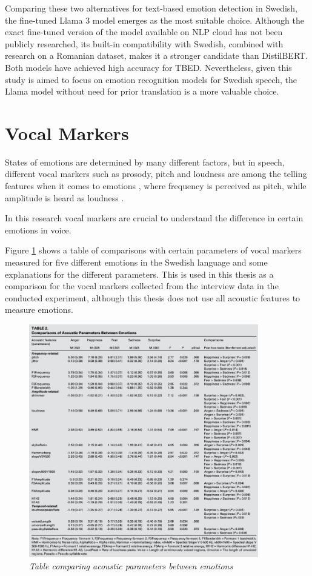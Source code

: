  Comparing these two alternatives for text-based emotion detection in Swedish, the fine-tuned Llama 3 model emerges as the most suitable choice. Although the exact fine-tuned version of the model available on NLP cloud has not been publicly researched, its built-in compatibility with Swedish, combined with research on a Romanian dataset, makes it a stronger candidate than DistilBERT. Both models have achieved high accuracy for TBED. Nevertheless, given this study is aimed to focus on emotion recognition models for Swedish speech, the Llama model without need for prior translation is a more valuable choice. 

 

\section{Vocal Markers}
\label{sec:vocal-markers}

 States of emotions are determined by many different factors, but in speech, different vocal markers such as prosody, pitch and loudness are among the telling features when it comes to emotions \autocite{Ekberg2023}, where frequency is perceived as pitch, while amplitude is heard as loudness \autocite{Frhholz2019}.

In this research vocal markers are crucial to understand the difference in certain emotions in voice.

 Figure \ref{fig:compare-acoustic-parameters} \autocite{Ekberg2023} shows a table of comparisons with certain parameters of vocal markers measured for five different emotions in the Swedish language and some explanations for the different parameters. This is used in this thesis as a comparison for the vocal markers collected from the interview data in the conducted experiment, although this thesis does not use all acoustic features to measure emotions.
 
\clearpage
\begin{figure}[ht]
    \centering
    \includegraphics[width=10cm]{png/Figure 7- Table comparing acoustic parameters.png}
    \caption{\textit{Table comparing acoustic parameters between emotions} \autocite{Ekberg2023}}
    \label{fig:compare-acoustic-parameters}
\end{figure}

